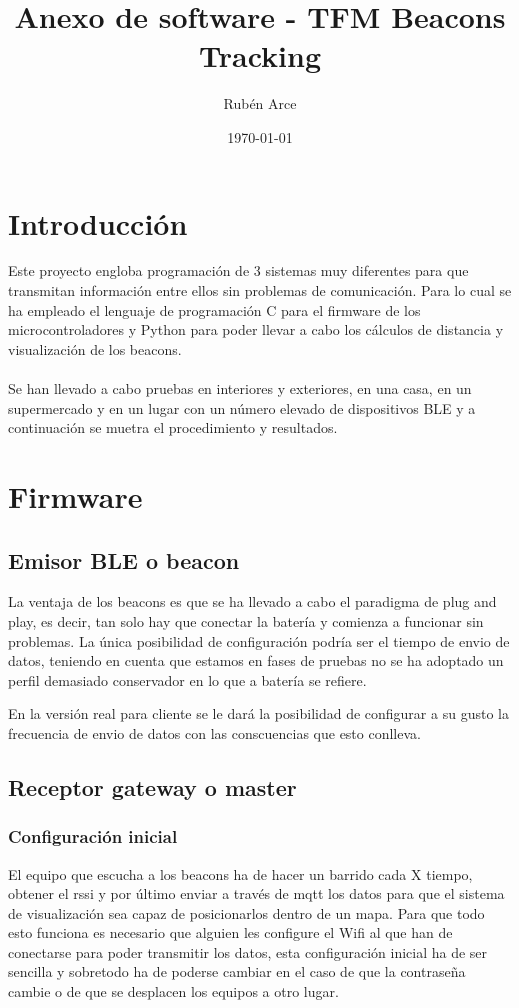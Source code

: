 \documentclass[a4paper ,12pt, onecolumn]{article}
\begin{document}
\pagestyle{fancy}
\title{Anexo de software - TFM Beacons Tracking}
\author{Rubén Arce}
\date{\today}
\maketitle
\cleardoublepage
\tableofcontents
\listoffigures
\cleardoublepage
\section{Introducción}
    Este proyecto engloba programación de 3 sistemas muy diferentes para que transmitan información entre ellos 
    sin problemas de comunicación. Para lo cual se ha empleado el lenguaje de programación C para el firmware de los 
    microcontroladores y Python para poder llevar a cabo los cálculos de distancia y visualización de los beacons.
    \paragraph{}
    Se han llevado a cabo pruebas en interiores y exteriores, en una casa, en un supermercado y en un lugar con un número elevado de dispositivos BLE y
    a continuación se muetra el procedimiento y resultados.
\section{Firmware}
    \subsection{Emisor BLE o beacon}
        La ventaja de los beacons es que se ha llevado a cabo el paradigma de plug and play, es decir, tan solo hay que conectar la batería y comienza 
        a funcionar sin problemas. La única posibilidad de configuración podría ser el tiempo de envio de datos, teniendo en cuenta que estamos en fases 
        de pruebas no se ha adoptado un perfil demasiado conservador en lo que a batería se refiere. 

        En la versión real para cliente se le dará la posibilidad de configurar a su gusto la frecuencia de envio de datos con las conscuencias 
        que esto conlleva.
    \subsection{Receptor gateway o master}
        \subsubsection{Configuración inicial}
        El equipo que escucha a los beacons ha de hacer un barrido cada X tiempo, obtener el rssi y por último enviar a través de mqtt los datos 
        para que el sistema de visualización sea capaz de posicionarlos dentro de un mapa.
        Para que todo esto funciona es necesario que alguien les configure el Wifi al que han de conectarse para poder transmitir los datos,
            esta configuración inicial ha de ser sencilla y sobretodo ha de poderse cambiar en el caso de que la contraseña cambie o de que se desplacen 
            los equipos a otro lugar.
            
\end{document}
